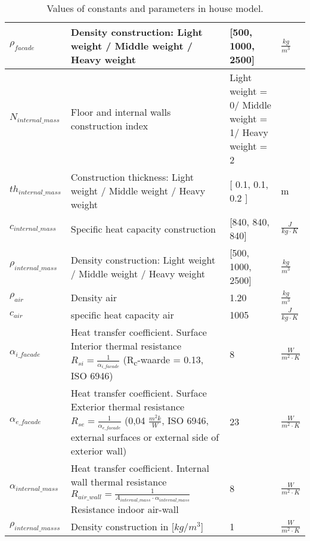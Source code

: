 \begin{table}[H]
\begin{tabular}{|p{3cm}||p{7cm}||p{3cm}||p{3cm}|}
 $\rho_{facade}$& Density construction: Light weight / Middle weight / Heavy weight  & [500, 1000, 2500] &$\frac{kg}{m^3}$\\
 \hline
 

 $N_{internal{\_}mass}$& Floor and internal walls construction index  & Light weight = 0/ Middle weight = 1/ Heavy weight = 2 &\\
 \hline
 
 $th_{internal{\_}mass}$& Construction thickness: Light weight / Middle weight / Heavy weight & [ 0.1,  0.1, 0.2 ] & m \\
 \hline
 
 $c_{internal{\_}mass}$& Specific heat capacity construction & [840, 840, 840] &$\frac{J}{kg \cdot K}$\\
 \hline
 
 $\rho_{internal{\_}mass}$& Density construction: Light weight / Middle weight / Heavy weight  & [500, 1000, 2500] &$\frac{kg}{m^3}$\\
 \hline
 
 $\rho_{air}$& Density air & 1.20 &$\frac{kg}{m^3}$\\
 \hline
  
 $c_{air}$& specific heat capacity air  & 1005 &$\frac{J}{kg \cdot K}$\\
 \hline
 
 $\alpha_{i{\_}facade}$ & Heat transfer coefficient. Surface Interior thermal resistance $R_{si} =\frac{1}{\alpha_{i{\_}facade}}$  (R\textsubscript{c}-waarde = 0.13, ISO 6946) & 8 & $\frac{W}{m^2 \cdot K}$ \\
 \hline
 
 $\alpha_{e{\_}facade}$ & Heat transfer coefficient. Surface Exterior thermal resistance $R_{se} =\frac{1}{\alpha_{e{\_}facade}}$ (0,04 $\frac{m^2k}{W}$, ISO 6946, external surfaces or external side of exterior wall) & 23 &$\frac{W}{m^2 \cdot K}$\\
 \hline
 
 $\alpha_{internal{\_}mass}$& Heat transfer coefficient. Internal wall thermal resistance $ R_{air{\_}wall} = \frac{1}{A_{internal{\_}mass} \cdot \alpha_{internal{\_}mass}} $ Resistance indoor air-wall  & 8 &$\frac{W}{m^2 \cdot K}$\\
 \hline
 
 $\rho_{internal{\_}masss}$& Density construction in [$kg/m^3$] & 1 & $\frac{W}{m^2 \cdot K}$\\
 \hline

\end{tabular}

\caption{Values of constants and parameters in house model.}
\label{tab:Paramteres}
\end{table}

